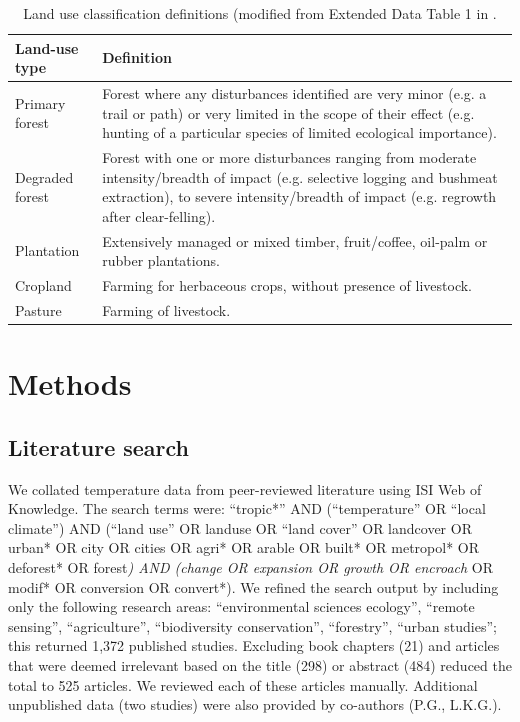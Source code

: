\documentclass[12pt,a4paper,]{report}
\theoremstyle{definition}
\theoremstyle{definition}
\theoremstyle{definition}
\theoremstyle{remark}
\begin{document}
\begin{table}
\begin{center}
\renewcommand{\arraystretch}{1} %
\setlength{\tabcolsep}{5pt} %
    \begin{tabular}{ lp{11cm}}
    \toprule 
    \bfseries Land-use type & \bfseries Definition \\ \midrule
    Primary forest  & Forest where any disturbances identified are very minor (e.g. a trail or path)
                      or very limited in the scope of their effect (e.g. hunting of a particular
                      species of limited ecological importance).\\
    Degraded forest & Forest with one or more disturbances ranging from moderate intensity/breadth
                      of impact (e.g. selective logging and bushmeat extraction), to severe
                      intensity/breadth of impact (e.g. regrowth after clear-felling).\\
    Plantation      & Extensively managed or mixed timber, fruit/coffee, oil-palm or rubber
                      plantations.\\
    Cropland        & Farming for herbaceous crops, without presence of livestock. \\
    Pasture         & Farming of livestock.\\
    \bottomrule
    \end{tabular}
\end{center}
\caption{\label{tab:tab-2-1}Land use classification definitions (modified from Extended Data Table 1 in \citet{newbold_global_2015}.}
\end{table}

\section{Methods}\label{methods}

\subsection{Literature search}\label{literature-search}

We collated temperature data from peer-reviewed literature using ISI Web
of Knowledge. The search terms were: ``tropic*'' AND (``temperature'' OR
``local climate'') AND (``land use'' OR landuse OR ``land cover'' OR
landcover OR urban* OR city OR cities OR agri* OR arable OR built* OR
metropol* OR deforest* OR forest\emph{) AND (change OR expansion OR
growth OR encroach} OR modif* OR conversion OR convert*). We refined the
search output by including only the following research areas:
``environmental sciences ecology'', ``remote sensing'', ``agriculture'',
``biodiversity conservation'', ``forestry'', ``urban studies''; this
returned 1,372 published studies. Excluding book chapters (21) and
articles that were deemed irrelevant based on the title (298) or
abstract (484) reduced the total to 525 articles. We reviewed each of
these articles manually. Additional unpublished data (two studies) were
also provided by co-authors (P.G., L.K.G.).
\end{document}
